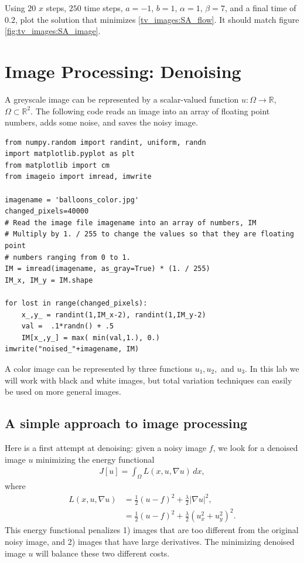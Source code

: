 \begin{problem}
Using $20$ $x$ steps, $250$ time steps, $a=-1$, $b=1$, $\alpha = 1$, $\beta=7$, and a final time of $0.2$, plot the solution that minimizes \eqref{tv_images:SA_flow}.
It should match figure \ref{fig:tv_images:SA_image}.

\end{problem}

\section*{Image Processing: Denoising}

A greyscale image can be represented by a scalar-valued function $u:\Omega \to \mathbb{R}$, $\Omega \subset \mathbb{R}^2$. The following code reads an image into an array of floating point numbers, adds some noise, and saves the noisy image.
\begin{lstlisting}
from numpy.random import randint, uniform, randn
import matplotlib.pyplot as plt
from matplotlib import cm
from imageio import imread, imwrite

imagename = 'balloons_color.jpg'
changed_pixels=40000
# Read the image file imagename into an array of numbers, IM
# Multiply by 1. / 255 to change the values so that they are floating point
# numbers ranging from 0 to 1.
IM = imread(imagename, as_gray=True) * (1. / 255)
IM_x, IM_y = IM.shape

for lost in range(changed_pixels):
    x_,y_ = randint(1,IM_x-2), randint(1,IM_y-2)
    val =  .1*randn() + .5
    IM[x_,y_] = max( min(val,1.), 0.)
imwrite("noised_"+imagename, IM)
\end{lstlisting}
A color image can be represented by three functions $u_1, u_2,$ and $u_3$. In this lab we will work with black and white images, but total variation techniques can easily be used on more general images.

\subsection*{A simple approach to image processing}
Here is a first attempt at denoising: given a noisy image $f$, we look for a denoised image $u$ minimizing the energy functional
\begin{align}
J[u] = \int_{\Omega} L(x,u,\nabla u) \, dx, \label{tv_images:diffusion}
\end{align}
where
\begin{align*}
L(x,u,\nabla u) &= \frac{1}{2}(u-f)^2 + \frac{\lambda}{2} | \nabla u|^2,\\
&= \frac{1}{2}(u-f)^2 + \frac{\lambda}{2} (u_x^2 + u_y^2)^2.
\end{align*}
This energy functional penalizes 1) images that are too different from the original noisy image, and 2) images that have large derivatives. The minimizing denoised image $u$ will balance these two different costs.

